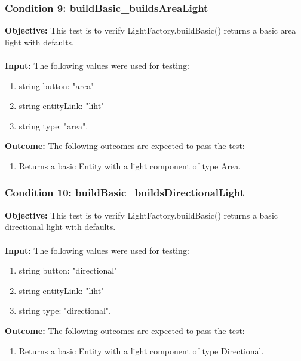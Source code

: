 \documentclass[a4paper,12pt]{article}
\begin{document}
		\subsubsection{Condition 9: buildBasic\_buildsAreaLight}
			\textbf{Objective:} This test is to verify  LightFactory.buildBasic() returns a basic area light with defaults.\\\\
			\textbf{Input:} The following values were used for testing:
				\begin{enumerate}
					\item string button: "area"
					\item string entityLink: "liht"
					\item string type: "area".
				\end{enumerate}
			\textbf{Outcome:} The following outcomes are expected to pass the test:
				\begin{enumerate}
					\item Returns a basic Entity with a light component of type Area.
				\end{enumerate}
		\subsubsection{Condition 10: buildBasic\_buildsDirectionalLight}
			\textbf{Objective:} This test is to verify  LightFactory.buildBasic() returns a basic directional light with defaults.\\\\
			\textbf{Input:} The following values were used for testing:
				\begin{enumerate}
					\item string button: "directional"
					\item string entityLink: "liht"
					\item string type: "directional".
				\end{enumerate}
			\textbf{Outcome:} The following outcomes are expected to pass the test:
				\begin{enumerate}
					\item Returns a basic Entity with a light component of type Directional.
				\end{enumerate}
\end{document}
